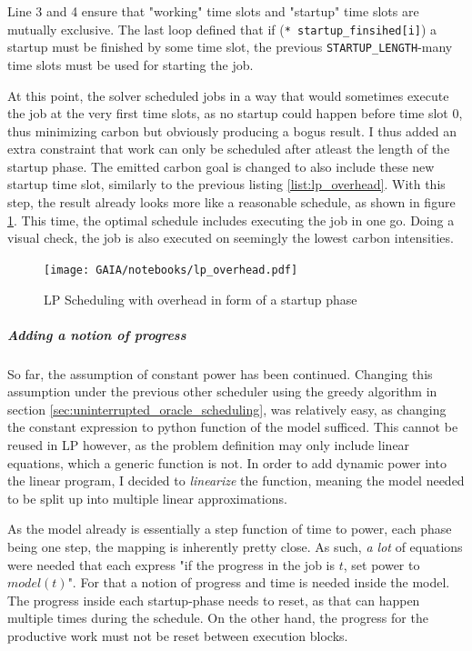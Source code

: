 Line 3 and 4 ensure that "working" time slots and "startup" time slots are mutually exclusive.
The last loop defined that if (\verb|* startup_finsihed[i]|) a startup must be finished by some time slot, the previous \verb|STARTUP_LENGTH|-many time slots must be used for starting the job.

At this point, the solver scheduled jobs in a way that would sometimes execute the job at the very first time slots, as no startup could happen before time slot $0$, thus minimizing carbon but obviously producing a bogus result.
I thus added an extra constraint that work can only be scheduled after atleast the length of the startup phase.
The emitted carbon goal is changed to also include these new startup time slot, similarly to the previous listing \ref{list:lp_overhead}.
With this step, the result already looks more like a reasonable schedule, as shown in figure \ref{fig:lp_overhead}. 
This time, the optimal schedule includes executing the job in one go.
Doing a visual check, the job is also executed on seemingly the lowest carbon intensities.

\begin{figure}
    \texttt{[image: GAIA/notebooks/lp\_overhead.pdf]}
    \caption{LP Scheduling with overhead in form of a startup phase}
    \label{fig:lp_overhead}
\end{figure}

\subparagraph{Adding a notion of progress}

So far, the assumption of constant power has been continued.
Changing this assumption under the previous other scheduler using the greedy algorithm in section \ref{sec:uninterrupted_oracle_scheduling}, was relatively easy, as changing the constant expression to python function of the model sufficed. 
This cannot be reused in LP however, as the problem definition may only include linear equations, which a generic function is not. 
In order to add dynamic power into the linear program, I decided to \emph{linearize} the function, meaning the model needed to be split up into multiple linear approximations.

As the model already is essentially a step function of time to power, each phase being one step, the mapping is inherently pretty close. 
As such, \emph{a lot} of equations were needed that each express "if the progress in the job is $t$, set power to $model(t)$". 
For that a notion of progress and time is needed inside the model.
The progress inside each startup-phase needs to reset, as that can happen multiple times during the schedule. 
On the other hand, the progress for the productive work must not be reset between execution blocks. 

